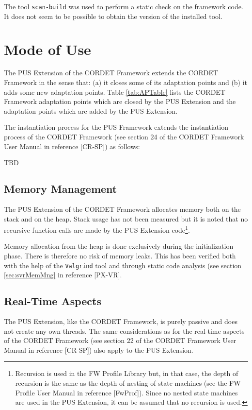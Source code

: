 \documentclass{pnp_article}
\begin{document}
The tool \texttt{scan-build} was used to perform a static check on the framework code. It does not seem to be possible to obtain the version of the installed tool.



\section{Mode of Use}
The PUS Extension of the CORDET Framework extends the CORDET Framework in the sense that: (a) it closes some of its adaptation points and (b) it adds some new adaptation points. Table \ref{tab:APTable} lists the CORDET Framework adaptation points which are closed by the PUS Extension and the adaptation points which are added by the PUS Extension.

The instantiation process for the PUS Framework extends the instantiation process of the CORDET Framework (see section 24 of the CORDET Framework User Manual in reference [CR-SP]) as follows:

TBD

\subsection{Memory Management}
The PUS Extension of the CORDET Framework allocates memory both on the stack and on the heap. Stack usage has not been measured but it is noted that no recursive function calls are made by the PUS Extension code\footnote{Recursion is used in the FW Profile Library but, in that case, the depth of recursion is the same as the depth of nesting of state machines (see the FW Profile User Manual in reference [FwProf]). Since no nested state machines are used in the PUS Extension, it can be assumed that no recursion is used.}.

Memory allocation from the heap is done exclusively during the initialization phase. There is therefore no risk of memory leaks. This has been verified both with the help of the \texttt{Valgrind} tool and through static code analysis (see section \ref{sec:svrMemMng} in reference [PX-VR]. 

\subsection{Real-Time Aspects}
The PUS Extension, like the CORDET Framework, is purely passive and does not create any own threads. The same considerations as for the real-time aspects of the CORDET Framework (see section 22 of the CORDET Framework User Manual in reference [CR-SP]) also apply to the PUS Extension.
\end{document}
